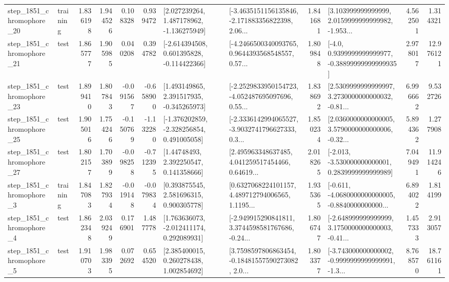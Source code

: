 \begin{tabular}{llrrrrllrlrr}
 step\_1851\_chromophore\_20 &  training &      1.836198 &    1.944526 &      0.108328 &  0.939472 &    [2.027239264, 1.487178962, -1.136275949] &  [-3.4635151156135846, -2.171883356822398, 2.06... &       1.841681 &  [3.103999999999999, 2.0159999999999982, -1.953... &            4.562501 &          1.314321 \\
 step\_1851\_chromophore\_21 &      test &      1.865777 &    1.905985 &      0.040208 &  0.394782 &   [-2.614394508, 0.601395828, -0.114422366] &  [-4.2466500340093765, 0.9644393568548557, 0.57... &       1.809848 &   [-4.0, 0.9399999999999977, -0.38899999999999935] &            2.978017 &         12.976121 \\
 step\_1851\_chromophore\_23 &      test &      1.899410 &    1.807843 &     -0.091567 & -0.658900 &    [1.493149865, 2.391517935, -0.345265973] &  [-2.2529833950154723, -4.052487695097696, 0.55... &       1.838692 &  [2.5309999999999997, 3.2730000000000032, -0.81... &            6.996662 &          9.532726 \\
 step\_1851\_chromophore\_25 &      test &      1.905016 &    1.754246 &     -0.150769 & -1.132280 &   [-1.376202859, -2.328256854, 0.491005058] &  [-2.3336142994065527, -3.9032741796627333, 0.3... &       1.850234 &  [2.0360000000000005, 3.5790000000000006, -0.32... &            5.894362 &          1.277908 \\
 step\_1851\_chromophore\_27 &      test &      1.802157 &    1.703899 &     -0.098258 & -0.712395 &      [1.44748493, 2.392250547, 0.141358666] &  [2.495963348637485, 4.041259517454466, 0.64619... &       2.018265 &   [-2.013, -3.530000000000001, 0.2839999999999989] &            7.049491 &         11.914246 \\
  step\_1851\_chromophore\_3 &  training &      1.847083 &    1.827934 &     -0.019148 & -0.079834 &     [0.393875545, 2.581696315, 0.900305778] &  [0.6327068224101157, 4.489712794006565, 1.1195... &       1.935365 &  [-0.611, -4.0680000000000005, -0.8840000000000... &            6.894022 &          1.814199 \\
  step\_1851\_chromophore\_4 &      test &      1.862348 &    2.039249 &      0.176901 &  1.487778 &    [1.763636073, -2.012411174, 0.292089931] &  [-2.949915290841811, 3.3744598581767686, -0.24... &       1.806747 &  [-2.648999999999999, 3.1750000000000003, -0.41... &            1.457333 &          2.913057 \\
  step\_1851\_chromophore\_5 &      test &      1.910703 &    1.983395 &      0.072692 &  0.654520 &     [2.385400015, 0.260278438, 1.002854692] &  [3.7598597806863454, -0.18481557590273082, 2.0... &       1.803377 &  [-3.743000000000002, -0.9999999999999991, -1.3... &            8.768570 &         18.761161 \\

\end{tabular}

